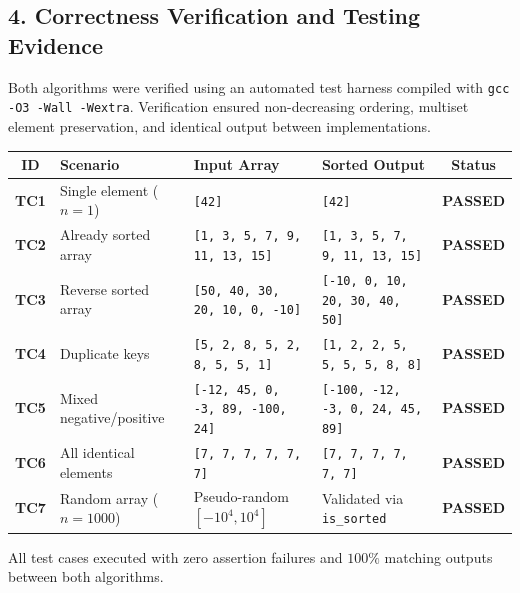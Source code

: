 \documentclass[11pt]{article}
\begin{document}
\vspace{-0.5em}
\subsection*{4. Correctness Verification and Testing Evidence}
Both algorithms were verified using an automated test harness compiled with \texttt{gcc -O3 -Wall -Wextra}. Verification ensured non-decreasing ordering, multiset element preservation, and identical output between implementations.

\begin{center}
\scriptsize
\renewcommand{\arraystretch}{0.90}
\vspace{-0.5em}
\begin{tabularx}{\textwidth}{c l >{\raggedright\arraybackslash}p{4.4cm} >{\raggedright\arraybackslash}p{4.4cm} c}
\toprule
\textbf{ID} & \textbf{Scenario} & \textbf{Input Array} & \textbf{Sorted Output} & \textbf{Status} \\
\midrule
\textbf{TC1} & Single element ($n=1$) & \texttt{[42]} & \texttt{[42]} & \textbf{PASSED} \\
\textbf{TC2} & Already sorted array & \texttt{[1, 3, 5, 7, 9, 11, 13, 15]} & \texttt{[1, 3, 5, 7, 9, 11, 13, 15]} & \textbf{PASSED} \\
\textbf{TC3} & Reverse sorted array & \texttt{[50, 40, 30, 20, 10, 0, -10]} & \texttt{[-10, 0, 10, 20, 30, 40, 50]} & \textbf{PASSED} \\
\textbf{TC4} & Duplicate keys & \texttt{[5, 2, 8, 5, 2, 8, 5, 5, 1]} & \texttt{[1, 2, 2, 5, 5, 5, 5, 8, 8]} & \textbf{PASSED} \\
\textbf{TC5} & Mixed negative/positive & \texttt{[-12, 45, 0, -3, 89, -100, 24]} & \texttt{[-100, -12, -3, 0, 24, 45, 89]} & \textbf{PASSED} \\
\textbf{TC6} & All identical elements & \texttt{[7, 7, 7, 7, 7, 7]} & \texttt{[7, 7, 7, 7, 7, 7]} & \textbf{PASSED} \\
\textbf{TC7} & Random array ($n=1000$) & Pseudo-random $[-10^4, 10^4]$ & Validated via \texttt{is\_sorted} & \textbf{PASSED} \\
\bottomrule
\end{tabularx}
\end{center}

\vspace{-0.3em}
\noindent All test cases executed with zero assertion failures and $100\%$ matching outputs between both algorithms.
\end{document}
